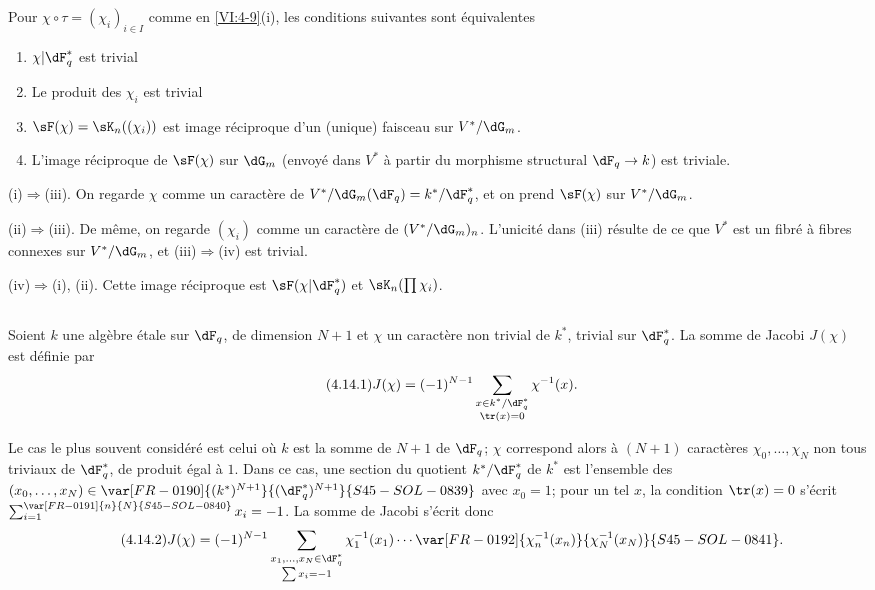 \begin{lemma_}\label{VI:4-13}
Pour $\chi\circ \tau=(\chi_i)_{i\in I}$ comme en \ref{VI:4-9}(i), les
conditions suivantes sont équivalentes 
\begin{enumerate}[\indent (i)]
  \item $\chi| \dF_q^\ast$ est trivial 
  \item Le produit des $\chi_i$ est trivial 
  \item $\sF(\chi) = \sK_n((\chi_i))$ est image réciproque d'un (unique) 
    faisceau sur $V^\ast/\dG_m$. 
  \item L'image réciproque de $\sF(\chi)$ sur $\dG_m$ (envoyé dans 
    $V^\ast$ à partir du morphisme structural $\dF_q \to k$) est triviale. 
\end{enumerate}
\end{lemma_}

(i)$\Rightarrow$(iii). On regarde $\chi$ comme un caractère de 
$V^\ast/\dG_m(\dF_q)=k^\ast/\dF_q^\ast$, et on prend $\sF(\chi)$ sur 
$V^\ast/\dG_m$. 

(ii)$\Rightarrow$(iii). De même, on regarde $(\chi_i)$ comme un caractère 
de $(V^\ast/\dG_m)_n$. L'unicité dans (iii) résulte de ce que $V^\ast$ est 
un fibré à fibres connexes sur $V^\ast/\dG_m$, et (iii)$\Rightarrow$(iv)  
est trivial. 

(iv)$\Rightarrow$(i), (ii). Cette image réciproque est 
$\sF(\chi|\dF_q^\ast)$ et $\sK_n(\prod \chi_i)$. 





\subsection{}\label{VI:4-14}

Soient $k$ une algèbre étale sur $\dF_q$, de 
dimension $N+1$ et $\chi$ un caractère non trivial de $k^\ast$, trivial sur 
$\dF_q^\ast$. La somme de Jacobi $J(\chi)$ est définie par 
\begin{equation*}\tag{4.14.1}\label{VI:eq:4-14-1}
  J(\chi) = (-1)^{N-1} \sum_{\substack{x\in k^\ast/\dF_q^\ast \\ \tr(x)=0}} \chi^{-1}(x) \text{.} 
\end{equation*}

Le cas le plus souvent considéré est celui où $k$ est la somme de $N+1$
 de $\dF_q$; $\chi$ correspond alors à $(N+1)$ caractères
$\chi_0,\ldots,\chi_N$ non tous triviaux de $\dF_q^\ast$, de produit égal à $1$.
Dans ce cas, une section du quotient $k^\ast/\dF_q^\ast$ de $k^\ast$
est l'ensemble des $(x_0,\ldots,x_N)\in\var[FR-0190]{(k^\ast)^{N+1}}{(\dF_q^\ast)^{N+1}}{S45-SOL-0839}$ avec $x_0=1$;
pour un tel $x$, la condition $\tr(x)=0$ s'écrit $\sum_{i=1}^{\var[FR-0191]{n}{N}{S45-SOL-0840}}x_i=-1$.
La somme de Jacobi s'écrit donc
\begin{equation*}\tag{4.14.2}\label{VI:eq:4-14-2}
 J(\chi)=(-1)^{N-1}\sum_{\substack{x_1,\ldots,x_N\in\dF_q^\ast\\\sum x_i=-1}}
 \chi_1^{-1}(x_1)\cdots\var[FR-0192]{\chi_n^{-1}(x_n)}{\chi_N^{-1}(x_N)}{S45-SOL-0841} \text{.}
\end{equation*}

